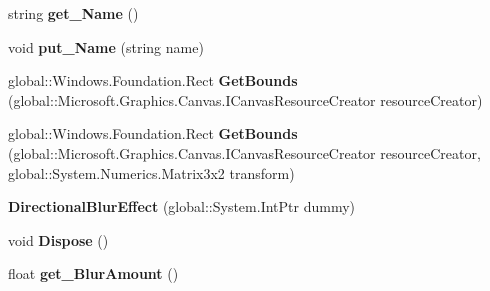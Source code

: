 \begin{DoxyCompactItemize}
string {\bfseries get\+\_\+\+Name} ()
\item 
\mbox{\label{class_microsoft_1_1_graphics_1_1_canvas_1_1_effects_1_1_directional_blur_effect_a4b13502da797a16d2154abba3fc65f50}} 
void {\bfseries put\+\_\+\+Name} (string name)
\item 
\mbox{\label{class_microsoft_1_1_graphics_1_1_canvas_1_1_effects_1_1_directional_blur_effect_ad8347e784aa6e6582222d02840320dc2}} 
global\+::\+Windows.\+Foundation.\+Rect {\bfseries Get\+Bounds} (global\+::\+Microsoft.\+Graphics.\+Canvas.\+I\+Canvas\+Resource\+Creator resource\+Creator)
\item 
\mbox{\label{class_microsoft_1_1_graphics_1_1_canvas_1_1_effects_1_1_directional_blur_effect_a3137686f00a07e07d6981f2a8816c3c1}} 
global\+::\+Windows.\+Foundation.\+Rect {\bfseries Get\+Bounds} (global\+::\+Microsoft.\+Graphics.\+Canvas.\+I\+Canvas\+Resource\+Creator resource\+Creator, global\+::\+System.\+Numerics.\+Matrix3x2 transform)
\item 
\mbox{\label{class_microsoft_1_1_graphics_1_1_canvas_1_1_effects_1_1_directional_blur_effect_aca330745fdae8062acfb902b9cf55db1}} 
{\bfseries Directional\+Blur\+Effect} (global\+::\+System.\+Int\+Ptr dummy)
\item 
\mbox{\label{class_microsoft_1_1_graphics_1_1_canvas_1_1_effects_1_1_directional_blur_effect_aaa6e87737de12565ab452869f4ad7497}} 
void {\bfseries Dispose} ()
\item 
\mbox{\label{class_microsoft_1_1_graphics_1_1_canvas_1_1_effects_1_1_directional_blur_effect_a43208f48efee475569eb87fb59bc9afc}} 
float {\bfseries get\+\_\+\+Blur\+Amount} ()
\item 
\mbox{\label{class_microsoft_1_1_graphics_1_1_canvas_1_1_effects_1_1_directional_blur_effect_af6383dc92843270529d3fe1da82d3f22}} 

\end{DoxyCompactItemize}
